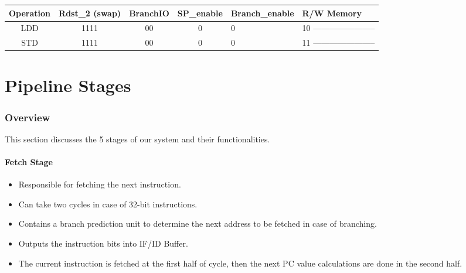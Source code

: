 \documentclass[12pt]{report}
\begin{document}
\begin{itemize}
\begin{center}
\begin{tabular}{||c| c| c| c| p{40mm}||}
        \end{tabular}
        \end{center}

        \begin{center}
        \begin{tabular}{||c| c| c| c| p{40mm}||} 
        \hline
        Operation & Rdst_2 (swap) & BranchIO & SP_enable & Branch_enable & R/W Memory  \\ [0.5ex] 
        \hline\hline
        LDD & 1111 & 00 & 0 & 0 & 10 ----------------------- \\
        \hline
        STD & 1111 & 00 & 0 & 0 & 11 ----------------------- \\
        \hline

        \end{tabular}
        \end{center}


\end{itemize}




\part{Pipeline Stages}

\section{Overview}
This section discusses the 5 stages of our system and their functionalities.

\subsection{Fetch Stage}
\begin{itemize}
    \item Responsible for fetching the next instruction.
    \item Can take two cycles in case of 32-bit instructions.
    \item Contains a branch prediction unit to determine the next address to be fetched in case of branching.
    \item Outputs the instruction bits into IF/ID Buffer.
    \item The current instruction is fetched at the first half of cycle, then the next PC value calculations are done in the second half.
\end{itemize}
\end{document}
